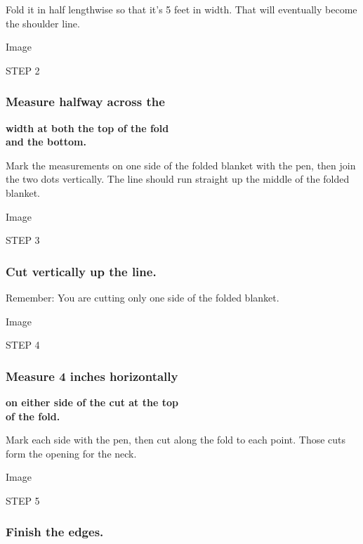 Fold it in half lengthwise so that it's 5 feet in width. That will
eventually become the shoulder line.

Image

STEP 2

\hypertarget{measure-halfway-across-the}{%
\subsubsection{\texorpdfstring{\textbf{Measure halfway across
the}}{Measure halfway across the}}\label{measure-halfway-across-the}}

\textbf{width at both the top of the fold}\\
\textbf{and the bottom.}

Mark the measurements on one side of the folded blanket with the pen,
then join the two dots vertically. The line should run straight up the
middle of the folded blanket.

Image

STEP 3

\hypertarget{cut-vertically-up-the-line}{%
\subsubsection{\texorpdfstring{\textbf{Cut vertically up the
line.}}{Cut vertically up the line.}}\label{cut-vertically-up-the-line}}

Remember: You are cutting only one side of the folded blanket.

Image

STEP 4

\hypertarget{measure-4-inches-horizontally}{%
\subsubsection{\texorpdfstring{\textbf{Measure 4 inches
horizontally}}{Measure 4 inches horizontally}}\label{measure-4-inches-horizontally}}

\textbf{on either side of the cut at the top}\\
\textbf{of the fold.}

Mark each side with the pen, then cut along the fold to each point.
Those cuts form the opening for the neck.

Image

STEP 5

\hypertarget{finish-the-edges}{%
\subsubsection{\texorpdfstring{\textbf{Finish the
edges.}}{Finish the edges.}}\label{finish-the-edges}}

